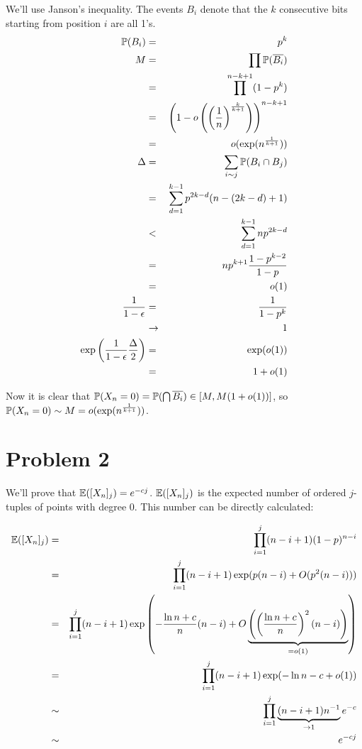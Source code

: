 \documentclass[a4paper]{article}
\begin{document}
We'll use Janson's inequality. The events $ B_i $ denote that the
$ k $ consecutive bits starting from position $ i $ are all 1's.
\begin{eqnarray*}
\P(B_i) &=& p^k \\
M &=& \prod \P(\overline{B_i}) \\
  &=& \prod^{n-k+1} (1 - p^k) \\
  &=& \B{1-o\B{\B{\frac{1}{n}}^\frac{k}{k+1}}}^{n-k+1} \\
  &=& o(\exp(n^\frac{1}{k+1})) \\
\Delta
  &=& \sum_{i\sim j}\P(B_i \cap B_j) \\
  &=& \sum_{d = 1}^{k-1} p^{2k-d}(n - (2k-d) + 1) \\
  &<& \sum_{d = 1}^{k-1} np^{2k-d} \\
  &=& np^{k+1}\frac{1 - p^{k-2}}{1 - p} \\
  &=& o(1) \\
\frac{1}{1 - \epsilon}
  &=& \frac{1}{1 - p^k} \\
  &\to& 1 \\
\exp\B{\frac{1}{1-\epsilon}\frac{\Delta}{2}}
  &=& \exp(o(1)) \\
  &=& 1 + o(1) \\
\end{eqnarray*}

Now it is clear that $ \P(X_n = 0) = \P(\bigcap \overline{B_i}) \in [M, M(1 + o(1))] $, so $ \P(X_n = 0) \sim M = o(\exp(n^\frac{1}{k+1})) $.

\section*{Problem 2}

We'll prove that $ \E([X_n]_j) = e^{-cj} $. $ \E([X_n]_j) $ is the expected number of ordered $j$-tuples of points with degree $ 0 $. This number can be directly calculated:

\begin{eqnarray*}
\E([X_n]_j)
  &=& \prod_{i=1}^{j} (n-i+1)(1-p)^{n-i} \\
  &=& \prod_{i=1}^{j} (n-i+1)\exp(p(n-i) + O(p^2(n-i))) \\
  &=& \prod_{i=1}^{j} (n-i+1)\exp\B{-\frac{\ln n + c}{n}(n-i)
                                    + O\underbrace{\B{\B{\frac{\ln n + c}{n}}^2(n-i)}}_{=o(1)}} \\
  &=& \prod_{i=1}^{j} (n-i+1)\exp(-\ln n - c + o(1)) \\
  &\sim& \prod_{i=1}^{j} \underbrace{(n-i+1)n^{-1}}_{\to 1}e^{-c} \\
  &\sim& e^{-cj} \\
\end{eqnarray*}
\end{document}
